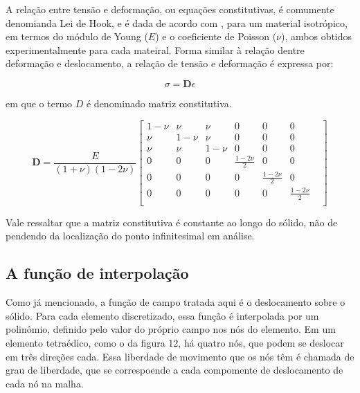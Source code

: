 A relação entre tensão e deformação, ou equações constitutivas, é comumente denomianda Lei de Hook, e é dada de acordo com , para um material isotrópico, em termos do módulo de Young ($E$) e o coeficiente de Poisson ($\nu$), ambos obtidos experimentalmente para cada mateiral. Forma similar à relação dentre deformação e deslocamento, a relação de tensão e deformação é expressa por:

\begin{equation}
    \sigma = \mathbf{D} \epsilon
\end{equation}

em que o termo $D$ é denominado matriz constitutiva.

\begin{equation} \label{eq:matriz_constitutiva}
    \mathbf{D} = \frac{E}{(1+\nu)(1 - 2\nu)} \begin{bmatrix}
        1 - \nu & \nu & \nu & 0 & 0 & 0 \\
        \nu & 1 - \nu & \nu & 0 & 0 & 0 \\
        \nu & \nu & 1 - \nu & 0 & 0 & 0 \\
        0 & 0 & 0 & \frac{1 - 2\nu}{2} & 0 & 0 \\
        0 & 0 & 0 & 0 &\frac{1 - 2\nu}{2} & 0 \\
        0 & 0 & 0 & 0 & 0 &\frac{1 - 2\nu}{2} & \\
    \end{bmatrix}
\end{equation}

Vale ressaltar que a matriz constitutiva é constante ao longo do sólido, não de pendendo da localização do ponto infinitesimal em análise.


\subsection{A função de interpolação}

Como já mencionado, a função de campo tratada aqui é o deslocamento sobre o sólido. Para cada elemento discretizado, essa função é interpolada por um polinômio, definido pelo valor do próprio campo nos nós do elemento. Em um elemento tetraédico, como o da figura 12, há quatro nós, que podem se deslocar em três direções cada. Essa liberdade de movimento que os nós têm é chamada de grau de liberdade, que se correspoende a cada compomente de deslocamento de cada nó na malha. 